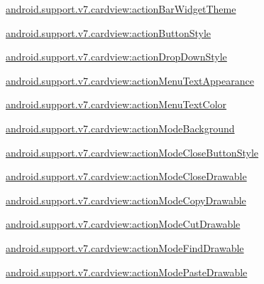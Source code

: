 {\ttfamily \hyperlink{classandroid_1_1support_1_1v7_1_1cardview_1_1R_1_1styleable_a3c5e0815c1f2e11931d5751bdea83e88}{android.\+support.\+v7.\+cardview\+:action\+Bar\+Widget\+Theme}}

{\ttfamily \hyperlink{classandroid_1_1support_1_1v7_1_1cardview_1_1R_1_1styleable_aaa6dcc1366883a5cd43e6dee5173fcaf}{android.\+support.\+v7.\+cardview\+:action\+Button\+Style}}

{\ttfamily \hyperlink{classandroid_1_1support_1_1v7_1_1cardview_1_1R_1_1styleable_a56b8b8128966a67324fa382f40a941e8}{android.\+support.\+v7.\+cardview\+:action\+Drop\+Down\+Style}}

{\ttfamily \hyperlink{classandroid_1_1support_1_1v7_1_1cardview_1_1R_1_1styleable_af99c77056c4366c7634c36bb75ea3709}{android.\+support.\+v7.\+cardview\+:action\+Menu\+Text\+Appearance}}

{\ttfamily \hyperlink{classandroid_1_1support_1_1v7_1_1cardview_1_1R_1_1styleable_aba0a97a0706db940133aa5927746c78f}{android.\+support.\+v7.\+cardview\+:action\+Menu\+Text\+Color}}

{\ttfamily \hyperlink{classandroid_1_1support_1_1v7_1_1cardview_1_1R_1_1styleable_a3daccfb428ba25d01af0a76d23f50715}{android.\+support.\+v7.\+cardview\+:action\+Mode\+Background}}

{\ttfamily \hyperlink{classandroid_1_1support_1_1v7_1_1cardview_1_1R_1_1styleable_a2a8f512e4939be1532337d4efd1ab3cd}{android.\+support.\+v7.\+cardview\+:action\+Mode\+Close\+Button\+Style}}

{\ttfamily \hyperlink{classandroid_1_1support_1_1v7_1_1cardview_1_1R_1_1styleable_a9587a4674c7e1d0eabdd8e93770ef690}{android.\+support.\+v7.\+cardview\+:action\+Mode\+Close\+Drawable}}

{\ttfamily \hyperlink{classandroid_1_1support_1_1v7_1_1cardview_1_1R_1_1styleable_ab9c8337b10dc73ac0b10a666f25230bb}{android.\+support.\+v7.\+cardview\+:action\+Mode\+Copy\+Drawable}}

{\ttfamily \hyperlink{classandroid_1_1support_1_1v7_1_1cardview_1_1R_1_1styleable_a92e60896480e5eb8639971dc11df7943}{android.\+support.\+v7.\+cardview\+:action\+Mode\+Cut\+Drawable}}

{\ttfamily \hyperlink{classandroid_1_1support_1_1v7_1_1cardview_1_1R_1_1styleable_ae43827121aad1319f95c73c42ae1af0d}{android.\+support.\+v7.\+cardview\+:action\+Mode\+Find\+Drawable}}

{\ttfamily \hyperlink{classandroid_1_1support_1_1v7_1_1cardview_1_1R_1_1styleable_a585391b394200065853c38c37575811d}{android.\+support.\+v7.\+cardview\+:action\+Mode\+Paste\+Drawable}}

